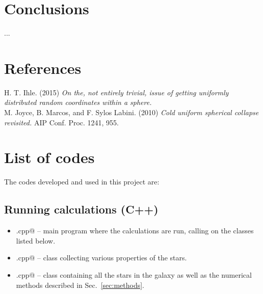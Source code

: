\documentclass{article}
\begin{document}
\begin{multicols}{2}
%
%






\section{Conclusions}

...


\section{References}

H. T. Ihle. (2015) \textit{On the, not entirely trivial, issue of getting uniformly distributed random coordinates within a sphere.} \\

\noindent M. Joyce, B. Marcos, and F. Sylos Labini. (2010) \textit{Cold uniform spherical collapse revisited.} AIP Conf. Proc. 1241, 955.



\section{List of codes}

The codes developed and used in this project are: 


\subsection{Running calculations (C++)}

\begin{itemize}
	\item \verb@main.cpp@ -- main program where the calculations are run, calling on the classes listed below. 
	\item \verb@star.cpp@ -- class collecting various properties of the stars.
	\item \verb@galaxy.cpp@ -- class containing all the stars in the galaxy as well as the numerical methods described in Sec.~\ref{sec:methods}.
\end{itemize}



\end{multicols}
\end{document}

